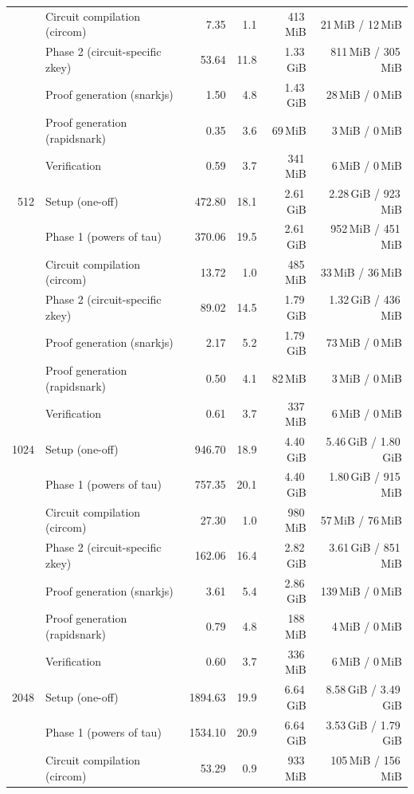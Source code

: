 \begin{table}[t]
{\begin{tabular}{|r|l|r|r|r|r|}
 & \quad Circuit compilation (circom) & 7.35 & 1.1 & 413\,MiB & 21\,MiB / 12\,MiB \\
 & \quad Phase 2 (circuit-specific zkey) & 53.64 & 11.8 & 1.33\,GiB & 811\,MiB / 305\,MiB \\
 & Proof generation (snarkjs) & 1.50 & 4.8 & 1.43\,GiB & 28\,MiB / 0\,MiB \\
 & Proof generation (rapidsnark) & 0.35 & 3.6 & 69\,MiB & 3\,MiB / 0\,MiB \\
 & Verification & 0.59 & 3.7 & 341\,MiB & 6\,MiB / 0\,MiB \\
\hline
512 & Setup (one-off) & 472.80 & 18.1 & 2.61\,GiB & 2.28\,GiB / 923\,MiB \\
 & \quad Phase 1 (powers of tau) & 370.06 & 19.5 & 2.61\,GiB & 952\,MiB / 451\,MiB \\
 & \quad Circuit compilation (circom) & 13.72 & 1.0 & 485\,MiB & 33\,MiB / 36\,MiB \\
 & \quad Phase 2 (circuit-specific zkey) & 89.02 & 14.5 & 1.79\,GiB & 1.32\,GiB / 436\,MiB \\
 & Proof generation (snarkjs) & 2.17 & 5.2 & 1.79\,GiB & 73\,MiB / 0\,MiB \\
 & Proof generation (rapidsnark) & 0.50 & 4.1 & 82\,MiB & 3\,MiB / 0\,MiB \\
 & Verification & 0.61 & 3.7 & 337\,MiB & 6\,MiB / 0\,MiB \\
\hline
1024 & Setup (one-off) & 946.70 & 18.9 & 4.40\,GiB & 5.46\,GiB / 1.80\,GiB \\
 & \quad Phase 1 (powers of tau) & 757.35 & 20.1 & 4.40\,GiB & 1.80\,GiB / 915\,MiB \\
 & \quad Circuit compilation (circom) & 27.30 & 1.0 & 980\,MiB & 57\,MiB / 76\,MiB \\
 & \quad Phase 2 (circuit-specific zkey) & 162.06 & 16.4 & 2.82\,GiB & 3.61\,GiB / 851\,MiB \\
 & Proof generation (snarkjs) & 3.61 & 5.4 & 2.86\,GiB & 139\,MiB / 0\,MiB \\
 & Proof generation (rapidsnark) & 0.79 & 4.8 & 188\,MiB & 4\,MiB / 0\,MiB \\
 & Verification & 0.60 & 3.7 & 336\,MiB & 6\,MiB / 0\,MiB \\
\hline
2048 & Setup (one-off) & 1894.63 & 19.9 & 6.64\,GiB & 8.58\,GiB / 3.49\,GiB \\
 & \quad Phase 1 (powers of tau) & 1534.10 & 20.9 & 6.64\,GiB & 3.53\,GiB / 1.79\,GiB \\
 & \quad Circuit compilation (circom) & 53.29 & 0.9 & 933\,MiB & 105\,MiB / 156\,MiB \\

\end{tabular}}
\end{table}
